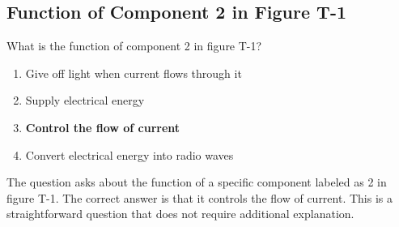 \subsection{Function of Component 2 in Figure T-1}
\label{T6D10}

\begin{tcolorbox}[colback=gray!10!white,colframe=black!75!black,title=T6D10]
What is the function of component 2 in figure T-1?
\begin{enumerate}[noitemsep]
    \item Give off light when current flows through it
    \item Supply electrical energy
    \item \textbf{Control the flow of current}
    \item Convert electrical energy into radio waves
\end{enumerate}
\end{tcolorbox}

The question asks about the function of a specific component labeled as 2 in figure T-1. The correct answer is that it controls the flow of current. This is a straightforward question that does not require additional explanation.